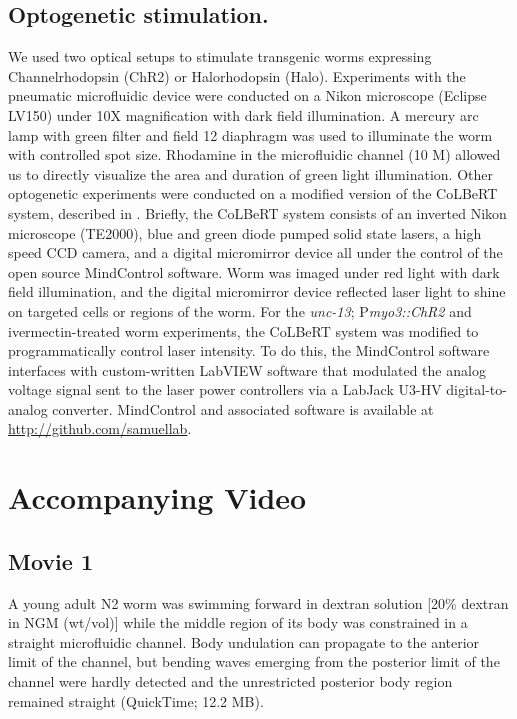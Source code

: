 \subsection{Optogenetic stimulation.}
 We used two optical setups to stimulate transgenic worms expressing 
Channelrhodopsin (ChR2) or Halorhodopsin (Halo). Experiments with the pneumatic 
microfluidic device were conducted on a Nikon microscope (Eclipse LV150) under 10X 
magnification with dark field illumination. A mercury arc lamp with green filter and field 
 12
diaphragm was used to illuminate the worm with controlled spot size. Rhodamine in the 
microfluidic channel (10 \textmu M) allowed us to directly visualize the area and duration of green light 
illumination. 
Other optogenetic experiments were conducted on a modified version of the CoLBeRT system, 
described in \citep{leifer_optogenetic_2011}. Briefly, the CoLBeRT system consists of an inverted Nikon microscope 
(TE2000), blue and green diode pumped solid state lasers, a high speed CCD camera, and a 
digital micromirror device all under the control of the open source MindControl software. Worm 
was imaged under red light with dark field illumination, and the digital micromirror device 
reflected laser light to shine on targeted cells or regions of the worm. For the \textit{unc-13}; 
P\textit{myo3::ChR2} and ivermectin-treated worm experiments, the CoLBeRT system was modified to 
programmatically control laser intensity. To do this, the MindControl software interfaces with 
custom-written LabVIEW software that modulated the analog voltage signal sent to the laser 
power controllers via a LabJack U3-HV digital-to-analog converter. MindControl and associated software is available at \url{http://github.com/samuellab}.  

\section{Accompanying Video}
\subsection{Movie 1}\label{movie:prop1}
 
A young adult N2 worm was swimming forward in dextran solution [20\% dextran in NGM 
(wt/vol)] while the middle region of its body was constrained in a straight microfluidic channel. 
Body undulation can propagate to the anterior limit of the channel, but bending waves emerging 
from the posterior limit of the channel were hardly detected and the unrestricted posterior body 
region remained straight (QuickTime; 12.2 MB). 
 
